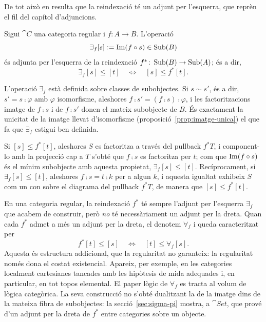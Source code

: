 De tot això en resulta que la reindexació té un adjunt per l'esquerra, que reprèn el fil del capítol d'adjuncions.

\begin{teorema}
\label{teo:existencial-adjunt}
Sigui $\cat{C}$ una categoria regular i $f\colon A\to B$. L'operació
\[
\exists_f[s]:=\operatorname{Im}(f\circ s)\in\operatorname{Sub}(B)
\]
és adjunta per l'esquerra de la reindexació $f^{*}\colon\operatorname{Sub}(B)\to\operatorname{Sub}(A)$; és a dir,
\[
\exists_f[s]\leq[t]\quad\Longleftrightarrow\quad[s]\leq f^{*}[t].
\]
\end{teorema}

\begin{observacio}
L'operació $\exists_f$ està definida sobre classes de subobjectes. Si $s\sim s'$, és a dir, $s'=s\comp\varphi$ amb $\varphi$ isomorfisme, aleshores $f\comp s'=(f\comp s)\comp\varphi$, i les factoritzacions imatge de $f\comp s$ i de $f\comp s'$ donen el mateix subobjecte de $B$. És exactament la unicitat de la imatge llevat d'isomorfisme (proposició~\ref{prop:imatge-unica}) el que fa que $\exists_f$ estigui ben definida.
\end{observacio}

\begin{prova}
Si $[s]\leq f^{*}[t]$, aleshores $S$ es factoritza a través del pullback $f^{*}T$, i component-lo amb la projecció cap a $T$ s'obté que $f\comp s$ es factoritza per $t$; com que $\operatorname{Im}(f\circ s)$ és el mínim subobjecte amb aquesta propietat, $\exists_f[s]\leq[t]$. Recíprocament, si $\exists_f[s]\leq[t]$, aleshores $f\comp s=t\comp k$ per a algun $k$, i aquesta igualtat exhibeix $S$ com un con sobre el diagrama del pullback $f^{*}T$, de manera que $[s]\leq f^{*}[t]$.
\end{prova}

\begin{observacio}
En una categoria regular, la reindexació $f^{*}$ té sempre l'adjunt per l'esquerra $\exists_f$ que acabem de construir, però \emph{no} té necessàriament un adjunt per la dreta. Quan cada $f^{*}$ admet a més un adjunt per la dreta, el denotem $\forall_f$ i queda caracteritzat per
\[
f^{*}[t]\leq[s]\quad\Longleftrightarrow\quad[t]\leq\forall_f[s].
\]
Aquesta és estructura addicional, que la regularitat no garanteix: la regularitat només dona el costat existencial. Apareix, per exemple, en les categories localment cartesianes tancades amb les hipòtesis de mida adequades i, en particular, en tot topos elemental. El paper lògic de $\forall_f$ es tracta al volum de lògica categòrica. La seva construcció no s'obté dualitzant la de la imatge dins de la mateixa fibra de subobjectes: la secció~\ref{sec:sigma-pi} mostra, a $\cat{Set}$, que prové d'un adjunt per la dreta de $f^{*}$ entre categories sobre un objecte.
\end{observacio}

